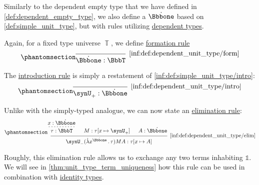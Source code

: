 \begin{definition}\label{def:dependent_unit_type}
  Similarly to the dependent empty type that we have defined in \cref{def:dependent_empty_type}, we also define a  \( \syn\Bbbone \) based on \cref{def:simple_unit_type}, but with rules utilizing \hyperref[con:dependent_type]{dependent types}.

  Again, for a fixed type universe \( \BbbT \), we define \hyperref[rem:type_theory_rule_classification/form]{formation rule}
  \begin{equation*}\taglabel[\ensuremath{ \Bbbone_{\logic{form}} }]{inf:def:dependent_unit_type/form}
    \begin{prooftree}
      \infer0[\ref{inf:def:dependent_unit_type/form}]{ \syn\Bbbone: \BbbT }
    \end{prooftree}
  \end{equation*}

  The \hyperref[rem:type_theory_rule_classification/intro]{introduction rule} is simply a restatement of \ref{inf:def:simple_unit_type/intro}:
  \begin{equation*}\taglabel[\ensuremath{ \Bbbone_+ }]{inf:def:dependent_unit_type/intro}
    \begin{prooftree}
      \infer0[\ref{inf:def:dependent_unit_type/intro}]{ \synU_+: \syn\Bbbone }
    \end{prooftree}
  \end{equation*}

  Unlike with the simply-typed analogue, we can now state an \hyperref[rem:type_theory_rule_classification/elim]{elimination rule}:
  \begin{equation*}\taglabel[\ensuremath{ \Bbbone_- }]{inf:def:dependent_unit_type/elim}
    \begin{prooftree}
      \hypo{ x: \syn\Bbbone }
      \infer[dashed]1{ \tau: \BbbT }

      \hypo{ M: \tau[x \mapsto \synU_+] }

      \hypo{ A: \syn\Bbbone }

      \infer3[\ref{inf:def:dependent_unit_type/elim}]{ \synU_- (\qabs {x^{\syn\Bbbone}} \tau) M A: \tau[x \mapsto A] }
    \end{prooftree}
  \end{equation*}

  Roughly, this elimination rule allows us to exchange any two terms inhabiting \( \Bbbone \). We will see in \cref{thm:unit_type_term_uniqueness} how this rule can be used in combination with \hyperref[def:identity_type]{identity types}.


\end{definition}
